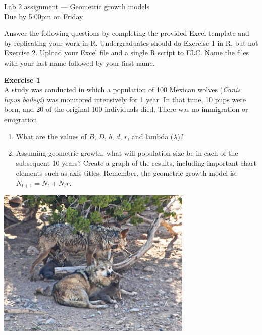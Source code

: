 \documentclass[12pt]{article}\usepackage[]{graphicx}\usepackage[]{xcolor}
\begin{document}
{
  \Large
  \centering
  Lab 2 assignment --- Geometric growth models \\
  Due by 5:00pm on Friday \par
}

Answer the following questions by completing the provided Excel 
template and by replicating your work in R. Undergraduates should do
Exercise 1 in R, but not Exercise 2. Upload your Excel file and a
single R script to ELC. Name the files with your last
name followed by your first name. \\ 

\vspace{12pt}

{\bf Exercise 1 \\}
A study was conducted in which a population of 100 Mexican wolves
({\it Canis lupus baileyi}) was monitored intensively for 1 year. In
that time, 10 pups were born, and 20 of the original 100 individuals 
died. There was no immigration or emigration.  

\begin{enumerate}
  \item What are the values of $B$, $D$, $b$, $d$, $r$, and lambda
    ($\lambda$)?
  \item Assuming geometric growth, what will population size be in
    each of the subsequent 10 years? Create a graph of the results,
    including important chart elements such as axis titles. Remember,
    the geometric growth model is: $N_{t+1} = N_t + N_t r$.
\end{enumerate}

\vspace{24pt}

{
  \centering
  \includegraphics[width=0.7\textwidth]{figs/Coronadopack2} \\
}


\clearpage
\end{document}
